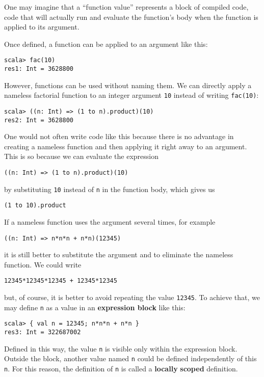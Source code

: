 One may imagine that a \textsf{``}function value\textsf{''} represents a block\emph{
}of compiled code, \textemdash{} code that will actually run and evaluate
the function\textsf{'}s body when the function is applied to its argument.

Once defined, a function can be applied to an argument like this:
\begin{lstlisting}
scala> fac(10)
res1: Int = 3628800
\end{lstlisting}

However, functions can be used without naming them. We can directly
apply a nameless factorial function to an integer argument \lstinline!10!
instead of writing \lstinline!fac(10)!:
\begin{lstlisting}
scala> ((n: Int) => (1 to n).product)(10)
res2: Int = 3628800
\end{lstlisting}
One would not often write code like this because there is no advantage
in creating a nameless function and then applying it right away to
an argument. This is so because we can evaluate the expression
\begin{lstlisting}
((n: Int) => (1 to n).product)(10)
\end{lstlisting}
by substituting \lstinline!10! instead of \lstinline!n! in the function
body, which gives us
\begin{lstlisting}
(1 to 10).product
\end{lstlisting}

If a nameless function uses the argument several times, for example
\begin{lstlisting}
((n: Int) => n*n*n + n*n)(12345)
\end{lstlisting}
it is still better to substitute the argument and to eliminate the
nameless function. We could write
\begin{lstlisting}
12345*12345*12345 + 12345*12345
\end{lstlisting}
but, of course, it is better to avoid repeating the value \lstinline!12345!.
To achieve that, we may define \texttt{}\lstinline!n! as a value
in an \textbf{expression block} like this:
\begin{lstlisting}
scala> { val n = 12345; n*n*n + n*n }
res3: Int = 322687002
\end{lstlisting}
Defined in this way, the value \lstinline!n! is visible only within
the expression block. Outside the block, another value named \lstinline!n!
could be defined independently of this \lstinline!n!. For this reason,
the definition of \lstinline!n! is called a \textbf{locally}
\textbf{scoped} definition.

